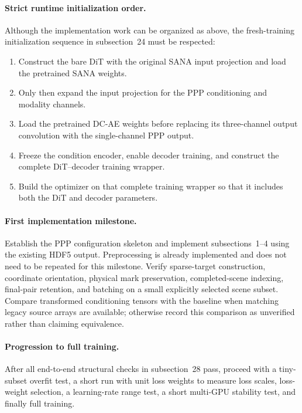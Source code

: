 \documentclass[11pt,a4paper]{article}
\begin{document}
\paragraph{Strict runtime initialization order.}
Although the implementation work can be organized as above, the
fresh-training initialization sequence in subsection~24 must be respected:
\begin{enumerate}
    \item Construct the bare DiT with the original SANA input projection
    and load the pretrained SANA weights.
    \item Only then expand the input projection for the PPP conditioning
    and modality channels.
    \item Load the pretrained DC-AE weights before replacing its
    three-channel output convolution with the single-channel PPP output.
    \item Freeze the condition encoder, enable decoder training, and
    construct the complete DiT--decoder training wrapper.
    \item Build the optimizer on that complete training wrapper so that
    it includes both the DiT and decoder parameters.
\end{enumerate}

\paragraph{First implementation milestone.}
Establish the PPP configuration skeleton and implement subsections~1--4
using the existing HDF5 output. Preprocessing is already implemented
and does not need to be repeated for this milestone.
Verify sparse-target construction, coordinate orientation, physical
mark preservation, completed-scene indexing, final-pair retention,
and batching on a small explicitly selected scene subset.
Compare transformed conditioning tensors with the baseline when
matching legacy source arrays are available; otherwise record this
comparison as unverified rather than claiming equivalence.

\paragraph{Progression to full training.}
After all end-to-end structural checks in subsection~28 pass, proceed with
a tiny-subset overfit test, a short run with unit loss weights to measure
loss scales, loss-weight selection, a learning-rate range test, a short
multi-GPU stability test, and finally full training.
\end{document}
